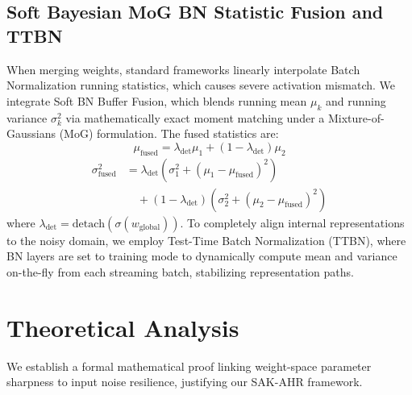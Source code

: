 \documentclass{article}
\theoremstyle{plain}
\theoremstyle{definition}
\theoremstyle{remark}
\begin{document}
\subsection{Soft Bayesian MoG BN Statistic Fusion and TTBN}
When merging weights, standard frameworks linearly interpolate Batch Normalization running statistics, which causes severe activation mismatch. We integrate Soft BN Buffer Fusion, which blends running mean $\mu_k$ and running variance $\sigma^2_k$ via mathematically exact moment matching under a Mixture-of-Gaussians (MoG) formulation. The fused statistics are:
\begin{equation}
\mu_{\text{fused}} = \lambda_{\text{det}} \mu_1 + (1 - \lambda_{\text{det}}) \mu_2
\end{equation}
\begin{equation}
\begin{split}
\sigma^2_{\text{fused}} &= \lambda_{\text{det}} \left( \sigma^2_1 + (\mu_1 - \mu_{\text{fused}})^2 \right) \\
&\quad + (1 - \lambda_{\text{det}}) \left( \sigma^2_2 + (\mu_2 - \mu_{\text{fused}})^2 \right)
\end{split}
\end{equation}
where $\lambda_{\text{det}} = \text{detach}(\sigma(w_{\text{global}}))$. To completely align internal representations to the noisy domain, we employ Test-Time Batch Normalization (TTBN), where BN layers are set to training mode to dynamically compute mean and variance on-the-fly from each streaming batch, stabilizing representation paths.

\section{Theoretical Analysis}
\label{sec:theory}

We establish a formal mathematical proof linking weight-space parameter sharpness to input noise resilience, justifying our SAK-AHR framework.
\end{document}
